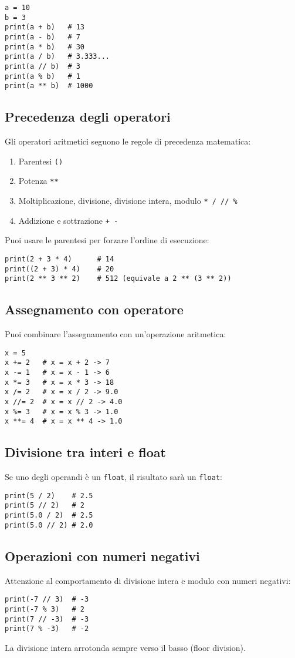 \documentclass[a4paper,12pt]{article}
\begin{document}
\begin{lstlisting}
a = 10
b = 3
print(a + b)   # 13
print(a - b)   # 7
print(a * b)   # 30
print(a / b)   # 3.333...
print(a // b)  # 3
print(a % b)   # 1
print(a ** b)  # 1000
\end{lstlisting}

\subsection*{Precedenza degli operatori}
Gli operatori aritmetici seguono le regole di precedenza matematica:
\begin{enumerate}
    \item Parentesi \texttt{()}
    \item Potenza \texttt{**}
    \item Moltiplicazione, divisione, divisione intera, modulo \texttt{* / // \%}
    \item Addizione e sottrazione \texttt{+ -}
\end{enumerate}
Puoi usare le parentesi per forzare l'ordine di esecuzione:
\begin{lstlisting}
print(2 + 3 * 4)      # 14
print((2 + 3) * 4)    # 20
print(2 ** 3 ** 2)    # 512 (equivale a 2 ** (3 ** 2))
\end{lstlisting}

\subsection*{Assegnamento con operatore}
Puoi combinare l'assegnamento con un'operazione aritmetica:
\begin{lstlisting}
x = 5
x += 2   # x = x + 2 -> 7
x -= 1   # x = x - 1 -> 6
x *= 3   # x = x * 3 -> 18
x /= 2   # x = x / 2 -> 9.0
x //= 2  # x = x // 2 -> 4.0
x %= 3   # x = x % 3 -> 1.0
x **= 4  # x = x ** 4 -> 1.0
\end{lstlisting}

\subsection*{Divisione tra interi e float}
Se uno degli operandi è un \texttt{float}, il risultato sarà un \texttt{float}:
\begin{lstlisting}
print(5 / 2)    # 2.5
print(5 // 2)   # 2
print(5.0 / 2)  # 2.5
print(5.0 // 2) # 2.0
\end{lstlisting}

\subsection*{Operazioni con numeri negativi}
Attenzione al comportamento di divisione intera e modulo con numeri negativi:
\begin{lstlisting}
print(-7 // 3)  # -3
print(-7 % 3)   # 2
print(7 // -3)  # -3
print(7 % -3)   # -2
\end{lstlisting}
La divisione intera arrotonda sempre verso il basso (floor division).
\end{document}
